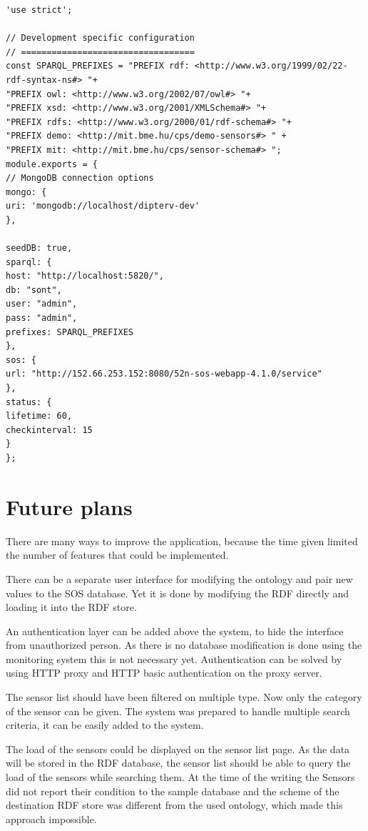 \begin{lstlisting}[caption={Sample configuration for development environment\label{lst:devconf}}]
'use strict';

// Development specific configuration
// ==================================
const SPARQL_PREFIXES = "PREFIX rdf: <http://www.w3.org/1999/02/22-rdf-syntax-ns#> "+
"PREFIX owl: <http://www.w3.org/2002/07/owl#> "+
"PREFIX xsd: <http://www.w3.org/2001/XMLSchema#> "+
"PREFIX rdfs: <http://www.w3.org/2000/01/rdf-schema#> "+
"PREFIX demo: <http://mit.bme.hu/cps/demo-sensors#> " +
"PREFIX mit: <http://mit.bme.hu/cps/sensor-schema#> ";
module.exports = {
// MongoDB connection options
mongo: {
uri: 'mongodb://localhost/dipterv-dev'
},

seedDB: true,
sparql: {
host: "http://localhost:5820/",
db: "sont",
user: "admin",
pass: "admin",
prefixes: SPARQL_PREFIXES
},
sos: {
url: "http://152.66.253.152:8080/52n-sos-webapp-4.1.0/service"
},
status: {
lifetime: 60,
checkinterval: 15
}
};
\end{lstlisting}

\section{Future plans}

There are many ways to improve the application, because the time given limited the number of features that could be implemented. 

There can be a separate user interface for modifying the ontology and pair new values to the SOS database. Yet it is done by modifying the RDF directly and loading it into the RDF store. 

An authentication layer can be added above the system, to hide the interface from unauthorized person. As there is no database modification is done using the monitoring system this is not necessary yet. Authentication can be solved by using HTTP proxy and HTTP basic authentication on the proxy server.

The sensor list should have been filtered on multiple type. Now only the category of the sensor can be given. The system was prepared to handle multiple search criteria, it can be easily added to the system.

The load of the sensors could be displayed on the sensor list page. As the data will be stored in the RDF database, the sensor list should be able to query the load of the sensors while searching them. At the time of the writing the Sensors did not report their condition to the sample database and the scheme of the destination RDF store was different from the used ontology, which made this approach impossible.


